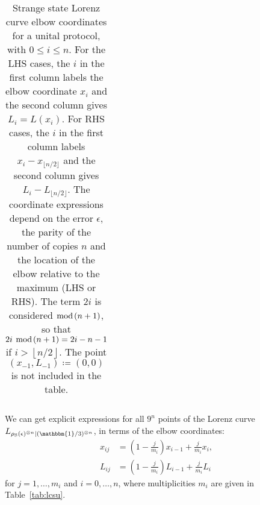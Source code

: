 \documentclass[
twocolumn,
superscriptaddress
]{revtex4-1}
\def\id{\mathbbm{1}}
\begin{document}
\begin{table}[h]
\begin{tabular}{c|c|c|r|r}
  \end{tabular}
  \caption{Strange state Lorenz curve elbow coordinates for a unital protocol, with $0 \leq i \leq n$. 
  For the LHS cases, the $i$ in the first column labels the elbow coordinate $x_i$ and the second column gives $L_i=L(x_i)$. For RHS cases, the $i$ in the first column labels $x_i - x_{\lfloor n/2 \rfloor}$ and the second column gives $L_i - L_{\lfloor n/2 \rfloor}$.
  The coordinate expressions depend on the error $\epsilon$, the parity of the number of copies $n$ and the location of the elbow relative to the maximum (LHS or RHS).
  The term $2i$ is considered $\hspace{-6pt}\mod{\hspace{-2pt}(n+1)}$, so that $2i\ \hspace{-6pt}\mod{\hspace{-2pt}(n+1)} = 2i - n - 1$ if $i > \left\lfloor n/2 \right\rfloor$.
  The point $(x_{-1}, L_{-1}) \coloneqq (0,0)$ is not included in the table.
  }
  \label{tab:lcsu_coord_elb_app}
\end{table}

We can get explicit expressions for all $9^{n}$ points of the Lorenz curve $L_{\rho_{\rm{S}}(\epsilon)^{\otimes n}|(\id/3)^{\otimes n}}$, in terms of the elbow coordinates:
\begin{align}
    x_{ij} &= \left( 1-\frac{j}{m_{i}} \right) x_{i-1} + \frac{j}{m_{i}} x_{i}, \label{eq:x}\\
    L_{ij} &= \left( 1-\frac{j}{m_{i}} \right) L_{i-1} + \frac{j}{m_{i}} L_{i} \label{eq:l}
\end{align}
for $j = 1,\dots,m_{i}$ and $i=0,\dots,n$, where multiplicities $m_i$ are given in Table~\ref{tab:lcsu}.
\end{document}
